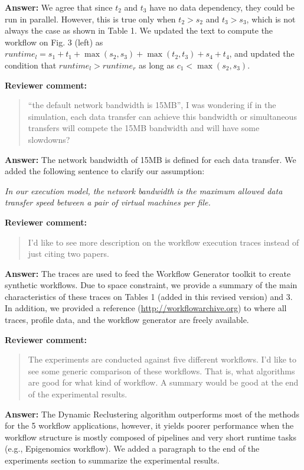 \documentclass{letter}
\newenvironment{review}%
{\textbf{Reviewer comment:}\begin{quote}}%
{\end{quote}}%
\newcommand{\answer}[1]{%
      \textbf{Answer:} #1}
\newcommand{\revised}[1]{\emph{#1}\color{black}}
\begin{document}
\begin{letter}{}
\answer{We agree that since $t_2$ and $t_3$ have no data dependency, they could be run in parallel. However, this is true only when $t_2 > s_2$ and $t_3 > s_3$, which is not always the case as shown in Table 1. We updated the text to compute the workflow on Fig. 3 (left) as $runtime_l= s_1+t_1+\max(s_2,s_3)+\max(t_2,t_3)+s_4+t_4$, and updated the condition that $runtime_l > runtime_r$ as long as $c_1 < \max(s_2,s_3)$.}




\begin{review}
``the default network bandwidth is 15MB'', I was wondering if in the simulation, each data transfer can achieve this bandwidth or simultaneous transfers will compete the 15MB bandwidth and will have some slowdowns?
\end{review}

\answer{The network bandwidth of 15MB is defined for each data transfer. We added the following sentence to clarify our assumption:}

\revised{In our execution model, the network bandwidth is the maximum allowed data transfer speed between a pair of virtual machines per file.}



\begin{review}
I'd like to see more description on the workflow execution traces instead of just citing two papers.
\end{review}

\answer{The traces are used to feed the Workflow Generator toolkit to create synthetic workflows. Due to space constraint, we provide a summary of the main characteristics of these traces on Tables 1 (added in this revised version) and 3. In addition, we provided a reference (\url{http://workflowarchive.org}) to where all traces, profile data, and the workflow generator are freely available.}



\begin{review}
The experiments are conducted against five different workflows. I'd like to see some generic comparison of these workflows. That is, what algorithms are good for what kind of workflow. A summary would be good at the end of the experimental results.
\end{review}

\answer{The Dynamic Reclustering algorithm outperforms most of the methods for the 5 workflow applications, however, it yields poorer performance when the workflow structure is mostly composed of pipelines and very short runtime tasks (e.g., Epigenomics workflow). We added a paragraph to the end of the experiments section to summarize the experimental results.}




\end{letter}
\end{document}
